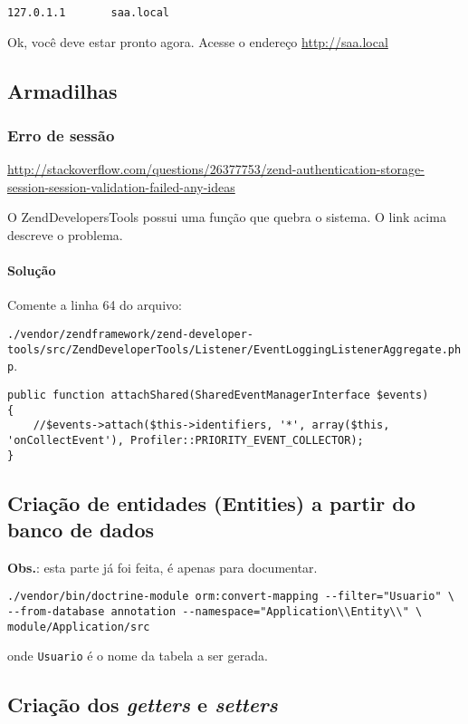\begin{verbatim}
127.0.1.1       saa.local
\end{verbatim}
Ok, você deve estar pronto agora. Acesse o endereço
\url{http://saa.local}

\subsection{Armadilhas}

\subsubsection{Erro de sessão}

\url{http://stackoverflow.com/questions/26377753/zend-authentication-storage-session-session-validation-failed-any-ideas}

O ZendDevelopersTools possui uma função que quebra o sistema. O link
acima descreve o problema.

\paragraph{Solução}

Comente a linha 64 do arquivo:

\texttt{./vendor/zendframework/zend-developer-tools/src/ZendDeveloperTools/Listener/EventLoggingListenerAggregate.php}.

\begin{verbatim}
public function attachShared(SharedEventManagerInterface $events)
{
    //$events->attach($this->identifiers, '*', array($this, 'onCollectEvent'), Profiler::PRIORITY_EVENT_COLLECTOR);
}
\end{verbatim}
\subsection{Criação de entidades (Entities) a partir do banco de dados}

\textbf{Obs.}: esta parte já foi feita, é apenas para documentar.

\begin{verbatim}
./vendor/bin/doctrine-module orm:convert-mapping --filter="Usuario" \
--from-database annotation --namespace="Application\\Entity\\" \
module/Application/src
\end{verbatim}
onde \texttt{Usuario} é o nome da tabela a ser gerada.

\subsection{Criação dos \emph{getters} e \emph{setters}}

